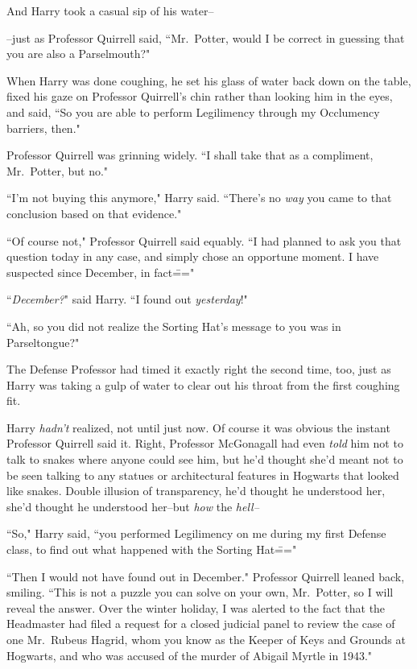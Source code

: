 And Harry took a casual sip of his water\---

\---just as Professor Quirrell said, ``Mr.~Potter, would I be correct in guessing that you are also a Parselmouth?"

When Harry was done coughing, he set his glass of water back down on the table, fixed his gaze on Professor Quirrell's chin rather than looking him in the eyes, and said, ``So you are able to perform Legilimency through my Occlumency barriers, then."

Professor Quirrell was grinning widely. ``I shall take that as a compliment, Mr.~Potter, but no."

``I'm not buying this anymore," Harry said. ``There's no \emph{way} you came to that conclusion based on that evidence."

``Of course not," Professor Quirrell said equably. ``I had planned to ask you that question today in any case, and simply chose an opportune moment. I have suspected since December, in fact\==="

``\emph{December?}" said Harry. ``I found out \emph{yesterday}!"

``Ah, so you did not realize the Sorting Hat's message to you was in Parseltongue?"

The Defense Professor had timed it exactly right the second time, too, just as Harry was taking a gulp of water to clear out his throat from the first coughing fit.

Harry \emph{hadn't} realized, not until just now. Of course it was obvious the instant Professor Quirrell said it. Right, Professor McGonagall had even \emph{told} him not to talk to snakes where anyone could see him, but he'd thought she'd meant not to be seen talking to any statues or architectural features in Hogwarts that looked like snakes. Double illusion of transparency, he'd thought he understood her, she'd thought he understood her\---but \emph{how} the \emph{hell\---}

``So," Harry said, ``you performed Legilimency on me during my first Defense class, to find out what happened with the Sorting Hat\==="

``Then I would not have found out in December." Professor Quirrell leaned back, smiling. ``This is not a puzzle you can solve on your own, Mr.~Potter, so I will reveal the answer. Over the winter holiday, I was alerted to the fact that the Headmaster had filed a request for a closed judicial panel to review the case of one Mr.~Rubeus Hagrid, whom you know as the Keeper of Keys and Grounds at Hogwarts, and who was accused of the murder of Abigail Myrtle in 1943."

